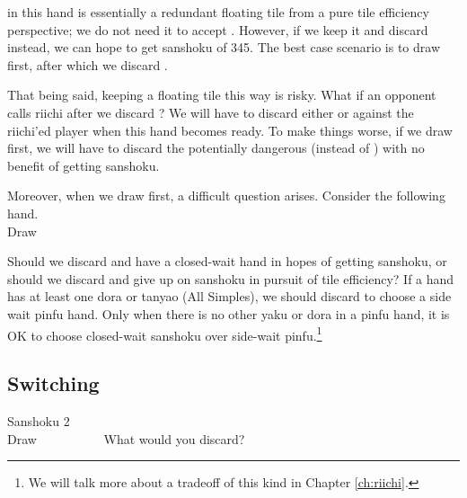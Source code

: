 \bigskip
{\LARGE{}} in this hand is essentially a redundant floating tile from a pure tile efficiency perspective; we do not need it to accept {\LARGE{}}. However, if we keep it and discard {\LARGE\bei} instead, we can hope to get {\jap sanshoku} of 345. The best case scenario is to draw {\LARGE{}} first, after which we discard {\LARGE{}}. 

\bigskip
That being said, keeping a floating tile this way is risky. What if an opponent calls riichi after we discard {\LARGE\bei}? We will have to discard either {\LARGE{}} or {\LARGE{}} against the riichi'ed player when this hand becomes ready. To make things worse, if we draw {\LARGE{}} first, we will have to discard the potentially dangerous {\LARGE{}} (instead of {\LARGE\bei}) with no benefit of getting {\jap sanshoku}. 

\bigskip
Moreover, when we draw {\LARGE{}} first, a difficult question arises. Consider the following hand. 
\bp
{}~\\
\hfill\footnotesize{Draw~~~~~~~~~~~~~~~}
\ep

Should we discard {\LARGE{}} and have a closed-wait hand in hopes of getting {\jap sanshoku}, or should we discard {\LARGE{}} and give up on {\jap sanshoku} in pursuit of tile efficiency?
If a hand has at least one {\jap dora} or {\jap tanyao} (All Simples), we should discard {\LARGE{}} to choose a side wait {\jap pinfu} hand. Only when there is no other {\jap yaku} or {\jap dora} in a {\jap pinfu} hand, it is OK to choose closed-wait {\jap sanshoku} over side-wait {\jap pinfu}.\footnote{We will talk more about a tradeoff of this kind in Chapter \ref{ch:riichi}.}




\bigskip
\subsection{Switching} \label{sec:san2}

\begin{itembox}[r]{{\jap Sanshoku} 2}
\bp
{}~\\
\hfill\footnotesize{Draw~~~~~~~~~~}
\ep
\vspace{-17pt}What would you discard? \vspace{-5pt}
\end{itembox}

